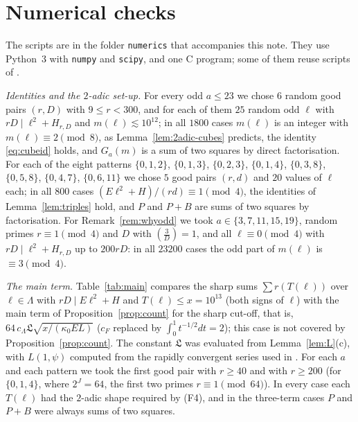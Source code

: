 \documentclass[11pt]{amsart}
\theoremstyle{remark}
\theoremstyle{definition}
\numberwithin{equation}{section}
\newcommand{\Lf}{\mathfrak{L}}
\newcommand{\leg}[2]{\left(\frac{#1}{#2}\right)}
\begin{document}
\section{Numerical checks}\label{sec:numerics}

The scripts are in the folder \texttt{numerics} that accompanies this note. They use Python~3 with \texttt{numpy} and \texttt{scipy}, and one C program; some of them reuse scripts of \cite{IC}.

\emph{Identities and the $2$-adic set-up.} For every odd $a\le23$ we chose $6$ random good pairs $(r,D)$ with $9\le r<300$, and for each of them $25$ random odd $\ell$ with $rD\mid\ell^2+H_{r,D}$ and $m(\ell)\lesssim10^{12}$; in all $1800$ cases $m(\ell)$ is an integer with $m(\ell)\equiv2\pmod 8$, as Lemma~\ref{lem:2adic-cubes} predicts, the identity \eqref{eq:cubeid} holds, and $G_a(m)$ is a sum of two squares by direct factorisation. For each of the eight patterns $\{0,1,2\}$, $\{0,1,3\}$, $\{0,2,3\}$, $\{0,1,4\}$, $\{0,3,8\}$, $\{0,5,8\}$, $\{0,4,7\}$, $\{0,6,11\}$ we chose $5$ good pairs $(r,d)$ and $20$ values of $\ell$ each; in all $800$ cases $(E\ell^2+H)/(rd)\equiv1\pmod 4$, the identities of Lemma~\ref{lem:triples} hold, and $P$ and $P+B$ are sums of two squares by factorisation. For Remark~\ref{rem:whyodd} we took $a\in\{3,7,11,15,19\}$, random primes $r\equiv1\pmod4$ and $D$ with $\leg3D=1$, and all $\ell\equiv0\pmod4$ with $rD\mid\ell^2+H_{r,D}$ up to $200rD$: in all $23200$ cases the odd part of $m(\ell)$ is $\equiv3\pmod4$.

\emph{The main term.} Table~\ref{tab:main} compares the sharp sums $\sum r(T(\ell))$ over $\ell\in\Lambda$ with $rD\mid E\ell^2+H$ and $T(\ell)\le x=10^{13}$ (both signs of $\ell$) with the main term of Proposition~\ref{prop:count} for the sharp cut-off, that is, $64\,c_\Lambda\Lf\sqrt{x/(\kappa_0EL)}$ ($c_F$ replaced by $\int_0^1t^{-1/2}dt=2$); this case is not covered by Proposition~\ref{prop:count}. The constant $\Lf$ was evaluated from Lemma~\ref{lem:L}(c), with $L(1,\psi)$ computed from the rapidly convergent series used in \cite{IC}. For each $a$ and each pattern we took the first good pair with $r\ge40$ and with $r\ge200$ (for $\{0,1,4\}$, where $2^J=64$, the first two primes $r\equiv1\pmod{64}$). In every case each $T(\ell)$ had the $2$-adic shape required by (F4), and in the three-term cases $P$ and $P+B$ were always sums of two squares.
\end{document}
